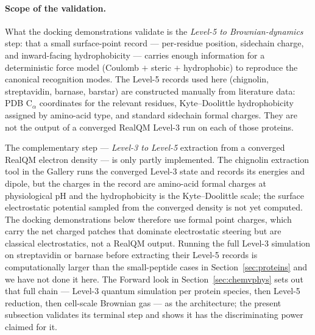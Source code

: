 \documentclass[11pt]{article}
\begin{document}
\paragraph{Scope of the validation.}
What the docking demonstrations validate is the \emph{Level-5 to Brownian-dynamics} step: that a small surface-point record --- per-residue position, sidechain charge, and inward-facing hydrophobicity --- carries enough information for a deterministic force model (Coulomb $+$ steric $+$ hydrophobic) to reproduce the canonical recognition modes. The Level-5 records used here (chignolin, streptavidin, barnase, barstar) are constructed manually from literature data: PDB C$_\alpha$ coordinates for the relevant residues, Kyte--Doolittle hydrophobicity assigned by amino-acid type, and standard sidechain formal charges. They are not the output of a converged RealQM Level-3 run on each of those proteins.

The complementary step --- \emph{Level-3 to Level-5} extraction from a converged RealQM electron density --- is only partly implemented. The chignolin extraction tool in the Gallery runs the converged Level-3 state and records its energies and dipole, but the charges in the record are amino-acid formal charges at physiological pH and the hydrophobicity is the Kyte--Doolittle scale; the surface electrostatic potential sampled from the converged density is not yet computed. The docking demonstrations below therefore use formal point charges, which carry the net charged patches that dominate electrostatic steering but are classical electrostatics, not a RealQM output. Running the full Level-3 simulation on streptavidin or barnase before extracting their Level-5 records is computationally larger than the small-peptide cases in Section~\ref{sec:proteins} and we have not done it here. The Forward look in Section~\ref{sec:chemvphys} sets out that full chain --- Level-3 quantum simulation per protein species, then Level-5 reduction, then cell-scale Brownian gas --- as the architecture; the present subsection validates its terminal step and shows it has the discriminating power claimed for it.
\end{document}
